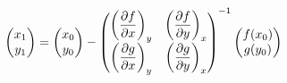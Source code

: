 \documentclass{standalone}
\begin{document}
$\displaystyle
  \begin{pmatrix}
     x_1 \\ y_1
  \end{pmatrix} = 
  \begin{pmatrix}
     x_0 \\ y_0
  \end{pmatrix} - 
  \begin{pmatrix}
     \left( \dfrac{\partial f}{\partial x} \right)_{y} & \left( \dfrac{\partial f}{\partial y} \right)_{x} \\ 
     \left( \dfrac{\partial g}{\partial x} \right)_{y} & \left( \dfrac{\partial g}{\partial y} \right)_{x}
  \end{pmatrix}^{-1}
  \begin{pmatrix}
     f(x_0) \\ g(y_0)
  \end{pmatrix}
$
\end{document}
